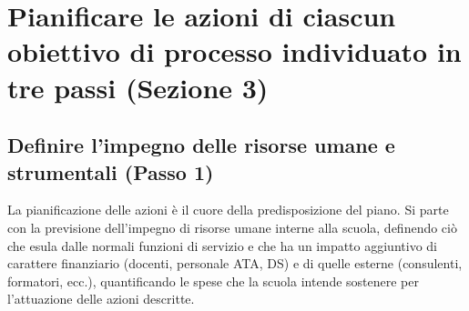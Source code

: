 \documentclass[12pt,a4paper,oneside]{memoir}
\begin{document}
\section[Sezione 3. Pianificare le azioni di ciascun obiettivo]{Pianificare le azioni di ciascun obiettivo di processo individuato in tre passi (Sezione 3)}

\subsection[Passo 1. Definire l'impegno delle risorse umane e strumentali]{Definire l'impegno delle risorse umane e strumentali (Passo 1)}

La pianificazione delle azioni è il cuore della predisposizione del piano. Si parte con la previsione dell'impegno di risorse umane interne alla scuola, definendo ciò che esula dalle normali funzioni di servizio e che ha un impatto aggiuntivo di carattere finanziario (docenti, personale ATA, DS) e di quelle esterne (consulenti, formatori, ecc.), quantificando le spese che la scuola intende sostenere per l'attuazione delle azioni descritte.\\

\begin{center}
\end{center} 
\end{document}
